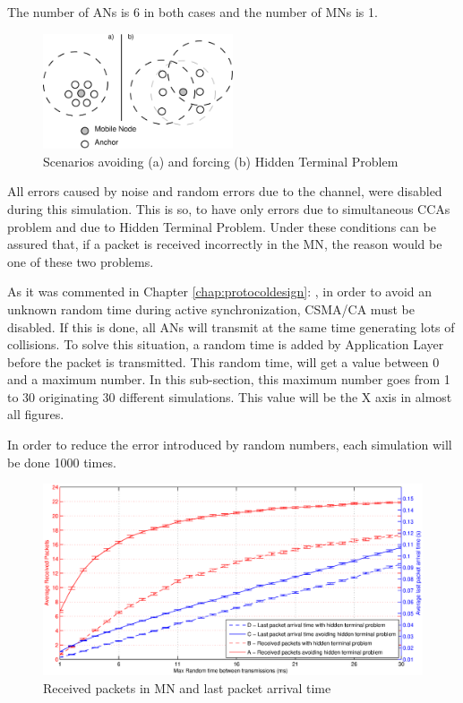 The number of \acp{AN} is 6 in both cases and the number of \acp{MN} is 1.

\begin{figure}[ht]
 \begin{center}
  \includegraphics[width=0.5\textwidth]{hiddenvsnohidden.eps}
 \end{center}
 \caption{Scenarios avoiding (a) and forcing (b) Hidden Terminal Problem}
 \label{fig:hiddenvsnohidden}
\end{figure}

All errors caused by noise and random errors due to the channel, were disabled during this simulation. This is so, to have only errors due to 
simultaneous \acp{CCA} problem and due to Hidden Terminal Problem. Under these conditions can be assured that, if a packet is received 
incorrectly in the \ac{MN}, the reason would be one of these two problems.

As it was commented in Chapter \ref{chap:protocoldesign}: , in order to avoid an unknown random time during active 
synchronization, \ac{CSMA/CA} must be disabled. If this is done, all \acp{AN} will transmit at the same time generating lots of collisions. 
To solve this situation, a random time is added by Application Layer before the packet is transmitted. This random time, will get a value
between 0 and a maximum number. In this sub-section, this maximum number goes from 1 to 30 originating 30 different simulations. This value will 
be the X axis in almost all figures. 

In order to reduce the error introduced by random numbers, each simulation will be done 1000 times.

\begin{figure}[ht]
 \begin{center}
  \includegraphics[width=1\textwidth]{receivedPacketsAndLastPacketArrival.eps}
 \end{center}
 \caption{Received packets in \ac{MN} and last packet arrival time}
 \label{fig:receivedPacketsAndLastPacketArrival}
\end{figure}


